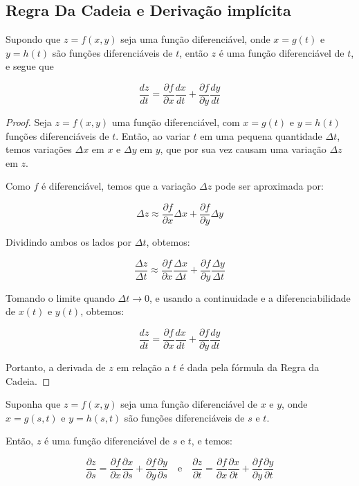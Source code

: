 \subsection{Regra Da Cadeia e Derivação implícita}

\begin{theorem}
	Supondo que $z = f(x, y)$ seja uma função diferenciável, onde $x = g(t)$ e $y = h(t)$ são funções diferenciáveis de $t$, então $z$ é uma função diferenciável de $t$, e segue que
	
	\[
	\dfrac{dz}{dt} = \dfrac{\partial f}{\partial x} \dfrac{dx}{dt} + \dfrac{\partial f}{\partial y} \dfrac{dy}{dt}
	\]
\end{theorem}

\begin{proof}
	Seja $z = f(x, y)$ uma função diferenciável, com $x = g(t)$ e $y = h(t)$ funções diferenciáveis de $t$. Então, ao variar $t$ em uma pequena quantidade $\Delta t$, temos variações $\Delta x$ em $x$ e $\Delta y$ em $y$, que por sua vez causam uma variação $\Delta z$ em $z$.
	
	Como $f$ é diferenciável, temos que a variação $\Delta z$ pode ser aproximada por:
	
	\[
	\Delta z \approx \frac{\partial f}{\partial x} \Delta x + \frac{\partial f}{\partial y} \Delta y
	\]
	
	Dividindo ambos os lados por $\Delta t$, obtemos:
	
	\[
	\frac{\Delta z}{\Delta t} \approx \frac{\partial f}{\partial x} \frac{\Delta x}{\Delta t} + \frac{\partial f}{\partial y} \frac{\Delta y}{\Delta t}
	\]
	
	Tomando o limite quando $\Delta t \to 0$, e usando a continuidade e a diferenciabilidade de $x(t)$ e $y(t)$, obtemos:
	
	\[
	\frac{dz}{dt} = \frac{\partial f}{\partial x} \frac{dx}{dt} + \frac{\partial f}{\partial y} \frac{dy}{dt}
	\]
	
	Portanto, a derivada de $z$ em relação a $t$ é dada pela fórmula da Regra da Cadeia.
\end{proof}

\begin{definition}
	Suponha que $z = f(x, y)$ seja uma função diferenciável de $x$ e $y$, onde $x = g(s, t)$ e $y = h(s, t)$ são funções diferenciáveis de $s$ e $t$.
	
	Então, $z$ é uma função diferenciável de $s$ e $t$, e temos:
	
	\[
	\frac{\partial z}{\partial s} = \frac{\partial f}{\partial x} \frac{\partial x}{\partial s} + \frac{\partial f}{\partial y} \frac{\partial y}{\partial s}
	\quad \text{e} \quad
	\frac{\partial z}{\partial t} = \frac{\partial f}{\partial x} \frac{\partial x}{\partial t} + \frac{\partial f}{\partial y} \frac{\partial y}{\partial t}
	\]
\end{definition}

